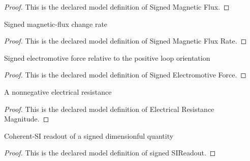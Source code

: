 \begin{proof}
  This is the declared model definition of Signed Magnetic Flux.
\end{proof}
\begin{definition}
  \label{def:physics:phyx-mini-0930:phyxminiproblems-problemphyxmini0930-signedmagneticfluxrate}
  Signed magnetic-flux change rate
\end{definition}
\begin{proof}
  This is the declared model definition of Signed Magnetic Flux Rate.
\end{proof}
\begin{definition}
  \label{def:physics:phyx-mini-0930:phyxminiproblems-problemphyxmini0930-signedelectromotiveforce}
  Signed electromotive force relative to the positive loop orientation
\end{definition}
\begin{proof}
  This is the declared model definition of Signed Electromotive Force.
\end{proof}
\begin{definition}
  \label{def:physics:phyx-mini-0930:phyxminiproblems-problemphyxmini0930-electricalresistancemagnitude}
  A nonnegative electrical resistance
\end{definition}
\begin{proof}
  This is the declared model definition of Electrical Resistance Magnitude.
\end{proof}
\begin{definition}
  \label{def:physics:phyx-mini-0930:phyxminiproblems-problemphyxmini0930-signedsireadout}
  Coherent-SI readout of a signed dimensionful quantity
\end{definition}
\begin{proof}
  This is the declared model definition of signed SIReadout.
\end{proof}
